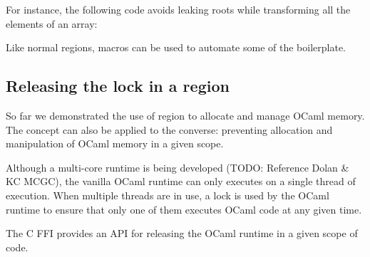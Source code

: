 \documentclass[a4paper]{easychair}
\begin{document}
For instance, the following code avoids leaking roots while transforming
all the elements of an array:

\begin{Shaded}
\begin{Highlighting}[]
\NormalTok{\{}
    \NormalTok{ (}
\NormalTok{    \{}
\NormalTok{    \}}
\NormalTok{\}}
\end{Highlighting}
\end{Shaded}

Like normal regions, macros can be used to automate some of the
boilerplate.

\hypertarget{releasing-the-lock-in-a-region}{%
\subsection{Releasing the lock in a
region}\label{releasing-the-lock-in-a-region}}

So far we demonstrated the use of region to allocate and manage OCaml
memory. The concept can also be applied to the converse: preventing
allocation and manipulation of OCaml memory in a given scope.

Although a multi-core runtime is being developed (TODO: Reference Dolan
\& KC MCGC), the vanilla OCaml runtime can only executes on a single
thread of execution. When multiple threads are in use, a lock is used by
the OCaml runtime to ensure that only one of them executes OCaml code at
any given time.

The C FFI provides an API for releasing the OCaml runtime in a given
scope of code.

\begin{Shaded}
\begin{Highlighting}[]
\NormalTok{);}
\NormalTok{);}
\end{Highlighting}
\end{Shaded}
\end{document}
